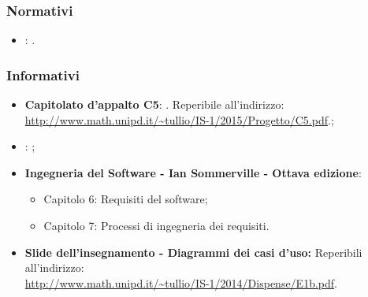 \subsubsection{Normativi}
\begin{itemize}
\item
\textbf{\NdP}: \textit{\NdPv}. 
\end{itemize}

\subsubsection{Informativi}
\begin{itemize}
	\item
	\textbf{Capitolato d'appalto C5}: \progetto. Reperibile all'indirizzo: \\
	\url{http://www.math.unipd.it/~tullio/IS-1/2015/Progetto/C5.pdf}.;
	\item
	\textbf{\SdF}: \textit{\SdF};
	\item
	\textbf{Ingegneria del Software - Ian Sommerville - Ottava edizione}:
	\begin{itemize}
		\item Capitolo 6: Requisiti del software;
		\item Capitolo 7: Processi di ingegneria dei requisiti.
	\end{itemize} 
	\item
	\textbf{Slide dell’insegnamento - Diagrammi dei casi d’uso:}  Reperibili all'indirizzo: \\ \url{http://www.math.unipd.it/~tullio/IS-1/2014/Dispense/E1b.pdf}.
\end{itemize}